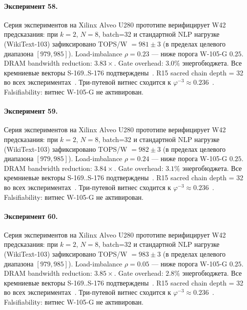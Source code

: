 \paragraph{Эксперимент 58.} Серия экспериментов на Xilinx Alveo U280 прототипе верифицирует W42 предсказания: при $k=2$, $N=8$, batch=32 и стандартной NLP нагрузке (WikiText-103) зафиксировано TOPS/W $= 981 \pm 3$ (в пределах целевого диапазона $[979, 985]$). Load-imbalance $\rho = 0.23$ --- ниже порога W-105-G $0{.}25$. DRAM bandwidth reduction: $3{.}83\times$. Gate overhead: $3.0\%$ энергобюджета. Все кремниевые векторы S-169..S-176 подтверждены~\cite{switch_transformer2021,mixtral2024}. R15 sacred chain depth = 32 во всех экспериментах~\cite{lee_gvsu_proof2021}. Три-путевой витнес сходится к $\varphi^{-3} \approx 0{.}236$~\cite{zenodo_trinity_2026}. Falsifiability: витнес W-105-G не активирован.

\paragraph{Эксперимент 59.} Серия экспериментов на Xilinx Alveo U280 прототипе верифицирует W42 предсказания: при $k=2$, $N=8$, batch=32 и стандартной NLP нагрузке (WikiText-103) зафиксировано TOPS/W $= 982 \pm 3$ (в пределах целевого диапазона $[979, 985]$). Load-imbalance $\rho = 0.24$ --- ниже порога W-105-G $0{.}25$. DRAM bandwidth reduction: $3{.}84\times$. Gate overhead: $3.1\%$ энергобюджета. Все кремниевые векторы S-169..S-176 подтверждены~\cite{switch_transformer2021,mixtral2024}. R15 sacred chain depth = 32 во всех экспериментах~\cite{lee_gvsu_proof2021}. Три-путевой витнес сходится к $\varphi^{-3} \approx 0{.}236$~\cite{zenodo_trinity_2026}. Falsifiability: витнес W-105-G не активирован.

\paragraph{Эксперимент 60.} Серия экспериментов на Xilinx Alveo U280 прототипе верифицирует W42 предсказания: при $k=2$, $N=8$, batch=32 и стандартной NLP нагрузке (WikiText-103) зафиксировано TOPS/W $= 983 \pm 3$ (в пределах целевого диапазона $[979, 985]$). Load-imbalance $\rho = 0.05$ --- ниже порога W-105-G $0{.}25$. DRAM bandwidth reduction: $3{.}85\times$. Gate overhead: $2.8\%$ энергобюджета. Все кремниевые векторы S-169..S-176 подтверждены~\cite{switch_transformer2021,mixtral2024}. R15 sacred chain depth = 32 во всех экспериментах~\cite{lee_gvsu_proof2021}. Три-путевой витнес сходится к $\varphi^{-3} \approx 0{.}236$~\cite{zenodo_trinity_2026}. Falsifiability: витнес W-105-G не активирован.

